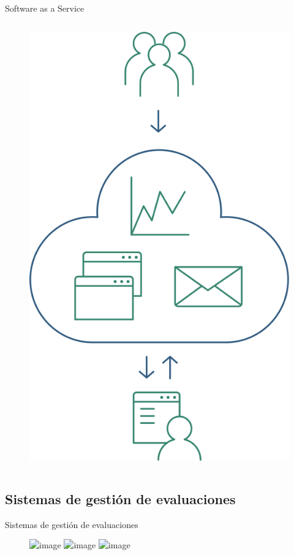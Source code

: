 \documentclass[10pt,xcolor=table]{beamer}
\begin{document}
\begin{frame}{Software as a Service}
\begin{columns}[c,onlytextwidth]
\begin{figure}[H]
			\includegraphics[scale=0.23]{../Figuras/saas}
		\end{figure}
  	\end{columns}
\end{frame}

\subsection{Sistemas de gestión de evaluaciones}
\begin{frame}{Sistemas de gestión de evaluaciones}
	\begin{figure}
		\centering
	    \includegraphics<1>[scale=0.55]{../Figuras/ams_1}
	    \includegraphics<2>[scale=0.55]{../Figuras/ams_2}
	    \includegraphics<3>[scale=0.55]{../Figuras/ams_3}
	\end{figure}
\end{frame}
\end{document}
